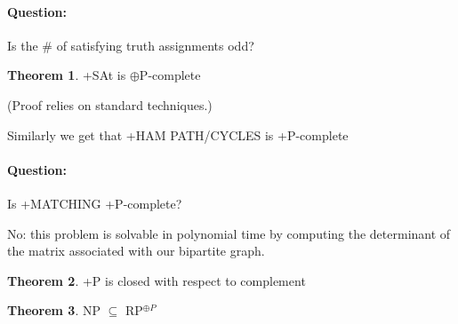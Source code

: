 \documentclass[11pt]{article}
\theoremstyle{definition}
\newtheorem{theorem}{Theorem}[section]
\theoremstyle{definition}
\begin{document}
\paragraph{Question:} Is the \# of satisfying truth assignments odd?

\begin{theorem}

+SAt is $\oplus$P-complete

\end{theorem}

(Proof relies on standard techniques.)

Similarly we get that +HAM PATH/CYCLES is +P-complete

\paragraph{Question:} Is +MATCHING +P-complete?

No: this problem is solvable in polynomial time by computing the determinant of the matrix associated with our bipartite graph.

\begin{theorem}
+P is closed with respect to complement
\end{theorem}

\begin{theorem}
NP $ \subseteq $ RP$^{\oplus P} $
\end{theorem}
\end{document}
